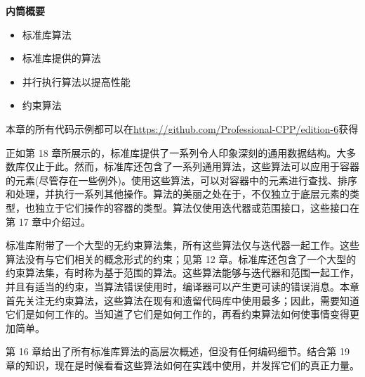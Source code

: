 \noindent
\textbf{内筒概要}

\begin{itemize}
\item
标准库算法

\item
标准库提供的算法

\item
并行执行算法以提高性能

\item
约束算法
\end{itemize}

本章的所有代码示例都可以在\url{https://github.com/Professional-CPP/edition-6}获得

正如第 18 章所展示的，标准库提供了一系列令人印象深刻的通用数据结构。大多数库仅止于此。然而，标准库还包含了一系列通用算法，这些算法可以应用于容器的元素(尽管存在一些例外)。使用这些算法，可以对容器中的元素进行查找、排序和处理，并执行一系列其他操作。算法的美丽之处在于，不仅独立于底层元素的类型，也独立于它们操作的容器的类型。算法仅使用迭代器或范围接口，这些接口在第 17 章中介绍过。

标准库附带了一个大型的无约束算法集，所有这些算法仅与迭代器一起工作。这些算法没有与它们相关的概念形式的约束；见第 12 章。标准库还包含了一个大型的约束算法集，有时称为基于范围的算法。这些算法能够与迭代器和范围一起工作，并且有适当的约束，当算法错误使用时，编译器可以产生更可读的错误消息。本章首先关注无约束算法，这些算法在现有和遗留代码库中使用最多；因此，需要知道它们是如何工作的。当知道了它们是如何工作的，再看约束算法如何使事情变得更加简单。

第 16 章给出了所有标准库算法的高层次概述，但没有任何编码细节。结合第 19 章的知识，现在是时候看看这些算法如何在实践中使用，并发挥它们的真正力量。
